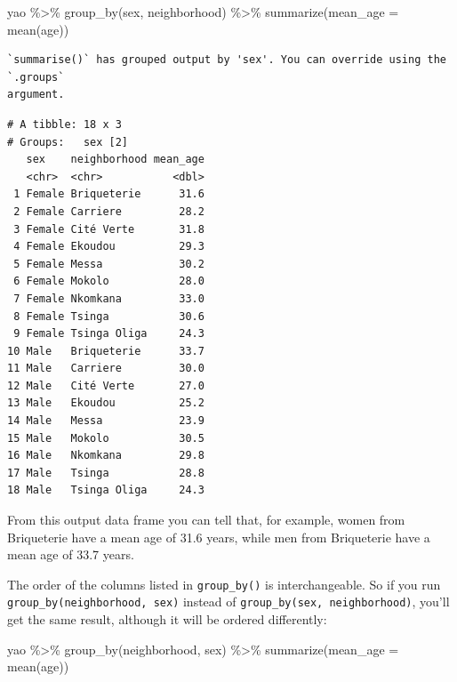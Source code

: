 \documentclass[
  letterpaper,
  DIV=11,
  numbers=noendperiod]{scrreprt}
\newenvironment{Shaded}{\begin{snugshade}}{\end{snugshade}}
\newcommand{\AttributeTok}[1]{\textcolor[rgb]{0.40,0.45,0.13}{#1}}
\newcommand{\FunctionTok}[1]{\textcolor[rgb]{0.28,0.35,0.67}{#1}}
\newcommand{\NormalTok}[1]{\textcolor[rgb]{0.00,0.23,0.31}{#1}}
\newcommand{\SpecialCharTok}[1]{\textcolor[rgb]{0.37,0.37,0.37}{#1}}
\begin{document}
\begin{Shaded}
\begin{Highlighting}[]
\NormalTok{yao }\SpecialCharTok{\%\textgreater{}\%} 
  \FunctionTok{group\_by}\NormalTok{(sex, neighborhood) }\SpecialCharTok{\%\textgreater{}\%} 
  \FunctionTok{summarize}\NormalTok{(}\AttributeTok{mean\_age =} \FunctionTok{mean}\NormalTok{(age))}
\end{Highlighting}
\end{Shaded}

\begin{verbatim}
`summarise()` has grouped output by 'sex'. You can override using the `.groups`
argument.
\end{verbatim}

\begin{verbatim}
# A tibble: 18 x 3
# Groups:   sex [2]
   sex    neighborhood mean_age
   <chr>  <chr>           <dbl>
 1 Female Briqueterie      31.6
 2 Female Carriere         28.2
 3 Female Cité Verte       31.8
 4 Female Ekoudou          29.3
 5 Female Messa            30.2
 6 Female Mokolo           28.0
 7 Female Nkomkana         33.0
 8 Female Tsinga           30.6
 9 Female Tsinga Oliga     24.3
10 Male   Briqueterie      33.7
11 Male   Carriere         30.0
12 Male   Cité Verte       27.0
13 Male   Ekoudou          25.2
14 Male   Messa            23.9
15 Male   Mokolo           30.5
16 Male   Nkomkana         29.8
17 Male   Tsinga           28.8
18 Male   Tsinga Oliga     24.3
\end{verbatim}

From this output data frame you can tell that, for example, women from
Briqueterie have a mean age of 31.6 years, while men from Briqueterie
have a mean age of 33.7 years.

The order of the columns listed in \texttt{group\_by()} is
interchangeable. So if you run \texttt{group\_by(neighborhood,\ sex)}
instead of \texttt{group\_by(sex,\ neighborhood)}, you'll get the same
result, although it will be ordered differently:

\begin{Shaded}
\begin{Highlighting}[]
\NormalTok{yao }\SpecialCharTok{\%\textgreater{}\%} 
  \FunctionTok{group\_by}\NormalTok{(neighborhood, sex) }\SpecialCharTok{\%\textgreater{}\%} 
  \FunctionTok{summarize}\NormalTok{(}\AttributeTok{mean\_age =} \FunctionTok{mean}\NormalTok{(age))}
\end{Highlighting}
\end{Shaded}
\end{document}
